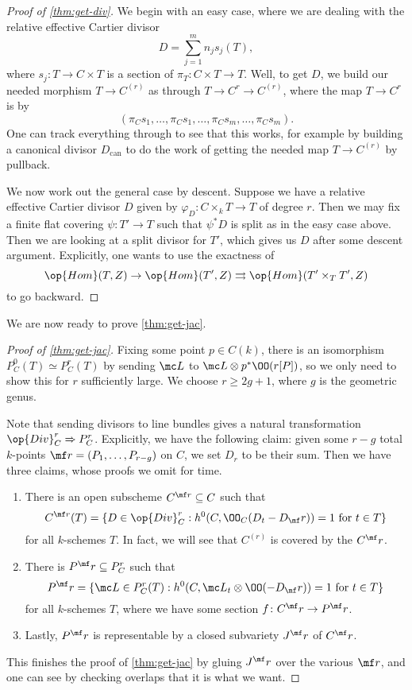 \documentclass[../notes.tex]{subfiles}
\begin{document}
\begin{proof}[{Proof of \autoref{thm:get-div}}]
	We begin with an easy case, where we are dealing with the relative effective Cartier divisor
	\[D=\sum_{j=1}^mn_js_j(T),\]
	where $s_j\colon T\to C\times T$ is a section of $\pi_T\colon C\times T\to T$. Well, to get $D$, we build our needed morphism $T\to C^{(r)}$ as through $T\to C^r\to C^{(r)}$, where the map $T\to C^r$ is by
	\[(\pi_Cs_1,\ldots,\pi_Cs_1,\ldots,\pi_Cs_m,\ldots,\pi_Cs_m).\]
	One can track everything through to see that this works, for example by building a canonical divisor $D_{\textrm{can}}$ to do the work of getting the needed map $T\to C^{(r)}$ by pullback.

	We now work out the general case by descent. Suppose we have a relative effective Cartier divisor $D$ given by $\varphi_D\colon C\times_kT\to T$ of degree $r$. Then we may fix a finite flat covering $\psi\colon T'\to T$ such that $\psi^*D$ is split as in the easy case above. Then we are looking at a split divisor for $T'$, which gives us $D$ after some descent argument. Explicitly, one wants to use the exactness of
	\[\op{Hom}(T,Z)\to\op{Hom}(T',Z)\rightrightarrows\op{Hom}(T'\times_TT',Z)\]
	to go backward.
\end{proof}
We are now ready to prove \autoref{thm:get-jac}.
\begin{proof}[{Proof of \autoref{thm:get-jac}}]
	Fixing some point $p\in C(k)$, there is an isomorphism $P^0_C(T)\simeq P^r_C(T)$ by sending $\mc L$ to $\mc L\otimes p^*\OO(r[P])$, so we only need to show this for $r$ sufficiently large. We choose $r\ge 2g+1$, where $g$ is the geometric genus.
	
	Note that sending divisors to line bundles gives a natural transformation $\op{Div}^r_C\Rightarrow P^r_C$. Explicitly, we have the following claim: given some $r-g$ total $k$-points $\mf r=(P_1,\ldots,P_{r-g})$ on $C$, we set $D_r$ to be their sum. Then we have three claims, whose proofs we omit for time.
	\begin{enumerate}
		\item There is an open subscheme $C^{\mf r}\subseteq C$ such that
		\[C^{\mf r}(T)=\{D\in\op{Div}^r_C:h^0(C,\OO_C(D_t-D_\mf r))=1\text{ for }t\in T\}\]
		for all $k$-schemes $T$. In fact, we will see that $C^{(r)}$ is covered by the $C^\mf r$.
		\item There is $P^\mf r\subseteq P^r_C$ such that
		\[P^\mf r=\{\mc L\in P^r_C(T):h^0(C,\mc L_t\otimes\OO(-D_\mf r))=1\text{ for }t\in T\}\]
		for all $k$-schemes $T$, where we have some section $f\colon C^\mf r\to P^\mf r$.
		\item Lastly, $P^\mf r$ is representable by a closed subvariety $J^\mf r$ of $C^\mf r$.
	\end{enumerate}
	This finishes the proof of \autoref{thm:get-jac} by gluing $J^\mf r$ over the various $\mf r$, and one can see by checking overlaps that it is what we want.
\end{proof}
\end{document}
